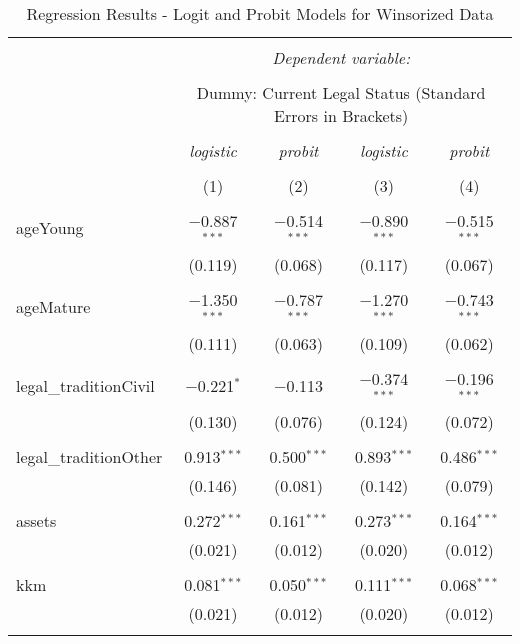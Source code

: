 \documentclass[a4paper,nobind]{templates/ociamthesis}
\begin{document}
\begin{table}[!htbp] \centering 
  \caption{Regression Results - Logit and Probit Models for Winsorized Data} 
  \label{} 
\footnotesize 
\begin{tabular}{@{\extracolsep{5pt}}lcccc} 
\\[-1.8ex]\hline 
\hline \\[-1.8ex] 
 & \multicolumn{4}{c}{\textit{Dependent variable:}} \\ 
\cline{2-5} 
\\[-1.8ex] & \multicolumn{4}{c}{Dummy: Current Legal Status (Standard Errors in Brackets)} \\ 
\\[-1.8ex] & \textit{logistic} & \textit{probit} & \textit{logistic} & \textit{probit} \\ 
\\[-1.8ex] & (1) & (2) & (3) & (4)\\ 
\hline \\[-1.8ex] 
 ageYoung & $-$0.887$^{***}$ & $-$0.514$^{***}$ & $-$0.890$^{***}$ & $-$0.515$^{***}$ \\ 
  & (0.119) & (0.068) & (0.117) & (0.067) \\ 
  & & & & \\ 
 ageMature & $-$1.350$^{***}$ & $-$0.787$^{***}$ & $-$1.270$^{***}$ & $-$0.743$^{***}$ \\ 
  & (0.111) & (0.063) & (0.109) & (0.062) \\ 
  & & & & \\ 
 legal\_traditionCivil & $-$0.221$^{*}$ & $-$0.113 & $-$0.374$^{***}$ & $-$0.196$^{***}$ \\ 
  & (0.130) & (0.076) & (0.124) & (0.072) \\ 
  & & & & \\ 
 legal\_traditionOther & 0.913$^{***}$ & 0.500$^{***}$ & 0.893$^{***}$ & 0.486$^{***}$ \\ 
  & (0.146) & (0.081) & (0.142) & (0.079) \\ 
  & & & & \\ 
 assets & 0.272$^{***}$ & 0.161$^{***}$ & 0.273$^{***}$ & 0.164$^{***}$ \\ 
  & (0.021) & (0.012) & (0.020) & (0.012) \\ 
  & & & & \\ 
 kkm & 0.081$^{***}$ & 0.050$^{***}$ & 0.111$^{***}$ & 0.068$^{***}$ \\ 
  & (0.021) & (0.012) & (0.020) & (0.012) \\ 
  & & & & \\ 

\end{tabular}
\end{table}
\end{document}

